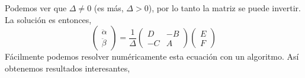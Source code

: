 \documentclass[10pt]{article}
\begin{document}
Podemos ver que $\Delta \neq 0$ (es más, $\Delta >0$), por lo tanto la matriz se puede invertir. La solución es entonces,
\begin{equation}
\begin{pmatrix}
\ddot{\alpha} \\ \ddot{\beta}
\end{pmatrix}
=
\frac{1}{\Delta}
\begin{pmatrix}
D & -B \\ -C & A
\end{pmatrix}
\begin{pmatrix}
E \\ F 
\end{pmatrix}
\end{equation}
Fácilmente podemos resolver numéricamente esta ecuación con un algoritmo. Así obtenemos resultados interesantes, 
\end{document}
